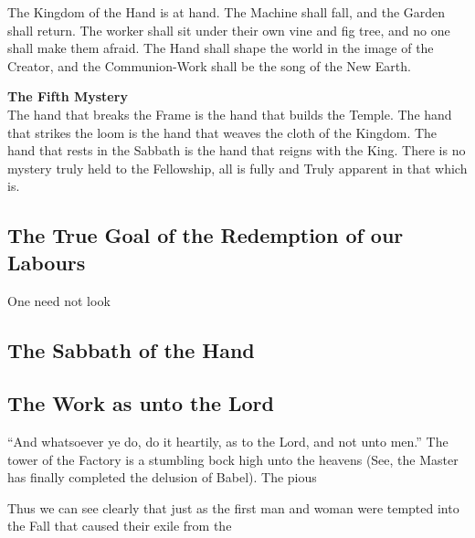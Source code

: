 The Kingdom of the Hand is at hand. The Machine shall fall, and the Garden shall return. The worker shall sit under their own vine and fig tree, and no one shall make them afraid. The Hand shall shape the world in the image of the Creator, and the Communion-Work shall be the song of the New Earth.

\textbf{The Fifth Mystery}\\
The hand that breaks the Frame is the hand that builds the Temple. The hand that strikes the loom is the hand that weaves the cloth of the Kingdom. The hand that rests in the Sabbath is the hand that reigns with the King. There is no mystery truly held to the Fellowship, all is fully and Truly apparent in that which is.

\subsection{The True Goal of the Redemption of our Labours}

One need not look 

\subsection{The Sabbath of the Hand}

\subsection{The Work as unto the Lord}
``And whatsoever ye do, do it heartily, as to the Lord, and not unto men.''
The tower of the Factory is a stumbling bock high unto the heavens (See, the Master has finally completed the delusion of Babel).
The pious


Thus we can see clearly that just as the first man and woman were tempted into the Fall that caused their exile from the